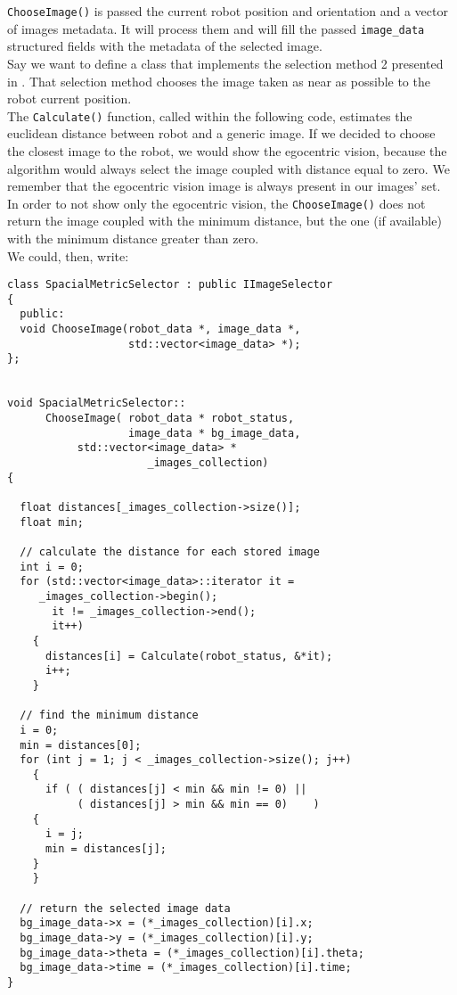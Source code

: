 \texttt{ChooseImage()} is passed the current robot position and
orientation and a vector of images metadata. It will process them 
and will fill the passed \texttt{image\_data} structured fields 
with the metadata of the selected image.
\\
Say we want to define a class that implements the selection 
method 2 presented in \cite{sugimoto}. That selection method
chooses the image taken as near as possible to the robot
current position.
\\
The \texttt{Calculate()} function, called within the following code,
estimates the euclidean distance between robot and a generic image.
If we decided to choose the closest image to the robot, we would
show the egocentric vision, because the algorithm would always
select the image coupled with distance equal to zero. We remember
that the egocentric vision image is always present in our images' set.
\\
In order to not show only the egocentric vision, the \texttt{ChooseImage()}
does not return the image coupled with the minimum distance, but the one
(if available) with the minimum distance greater than zero.
\\
We could, then, write:

\begin{lstlisting}[caption={A possible \texttt{ChooseImage} implementation}, label={code:chooseimage_impl}, frame=trBL]
class SpacialMetricSelector : public IImageSelector
{
  public:
  void ChooseImage(robot_data *, image_data *, 
                   std::vector<image_data> *);
};


void SpacialMetricSelector::
      ChooseImage( robot_data * robot_status, 
                   image_data * bg_image_data,
		   std::vector<image_data> * 
                      _images_collection)
{

  float distances[_images_collection->size()];
  float min;

  // calculate the distance for each stored image
  int i = 0;
  for (std::vector<image_data>::iterator it =
	 _images_collection->begin();
       it != _images_collection->end();
       it++)
    {
      distances[i] = Calculate(robot_status, &*it);
      i++;
    }

  // find the minimum distance
  i = 0;
  min = distances[0];
  for (int j = 1; j < _images_collection->size(); j++)
    {
      if ( ( distances[j] < min && min != 0) || 
           ( distances[j] > min && min == 0)    )
	{
	  i = j;
	  min = distances[j];
	}
    }

  // return the selected image data
  bg_image_data->x = (*_images_collection)[i].x;
  bg_image_data->y = (*_images_collection)[i].y;
  bg_image_data->theta = (*_images_collection)[i].theta;
  bg_image_data->time = (*_images_collection)[i].time;
}
\end{lstlisting}
